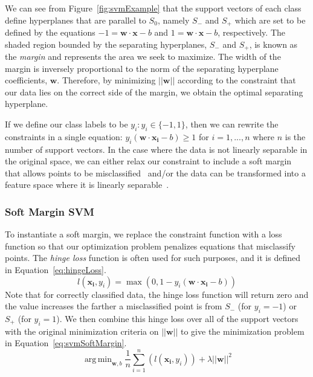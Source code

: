 \documentclass[12pt]{article}
\DeclareMathOperator*{\argmin}{arg\,min}
\begin{document}
We can see from Figure~\ref{fig:svmExample} that the support vectors of each
class define hyperplanes that are parallel to $S_0$, namely $S_{-}$ and $S_{+}$
which are set to be defined by the equations $-1 = \mathbf{w} \cdot \mathbf{x} -
b$ and $1 = \mathbf{w} \cdot \mathbf{x} - b$, respectively.
%
The shaded region bounded by the separating hyperplanes, $S_{-}$ and $S_{+}$,
is known as the \emph{margin} and represents the area we seek to maximize.
%
The width of the margin is inversely proportional to the norm of the separating
hyperplane coefficients, $\mathbf{w}$.
%
Therefore, by minimizing $||\mathbf{w}||$ according to the constraint that our
data lies on the correct side of the margin, we obtain the optimal separating
hyperplane.

If we define our class labels to be $y_i: y_i \in \{-1,1\}$, then we can rewrite
the constraints in a single equation: $y_i(\mathbf{w} \cdot \mathbf{x_i} - b )
\geq 1$ for $i=1,...,n$ where $n$ is the number of support vectors.
%
In the case where the data is not linearly separable in the original space, we
can either relax our constraint to include a soft margin that allows points to
be misclassified~\cite{CortesVapnik1995} and/or the data can be transformed into
a feature space where it is linearly separable~\cite{BoserGuyonVapnik1992}.

\subsubsection{Soft Margin SVM}

To instantiate a soft margin, we replace the constraint function with a loss
function so that our optimization problem penalizes equations that misclassify
points.
%
The \emph{hinge loss} function is often used for such purposes, and it is
defined in Equation~\ref{eq:hingeLoss}.
%
\begin{equation}
l(\mathbf{x_i},y_i) = \max(0,1-y_i(\mathbf{w} \cdot \mathbf{x_i} - b))
\label{eq:hingeLoss}
\end{equation}
%
Note that for correctly classified data, the hinge loss function will return
zero and the value increases the farther a misclassified point is from $S_-$
(for $y_i=-1$) or $S_+$ (for $y_i=1$).
%
We then combine this hinge loss over all of the support vectors with the
original minimization criteria on $||\mathbf{w}||$ to give the minimization
problem in Equation~\ref{eq:svmSoftMargin}.
\begin{equation}
\argmin_{\mathbf{w},b}\frac{1}{n}\sum_{i=1}^n \left(l(\mathbf{x_i},y_i)\right) +
\lambda ||\mathbf{w}||^2
\label{eq:svmSoftMargin}
\end{equation}
\end{document}
